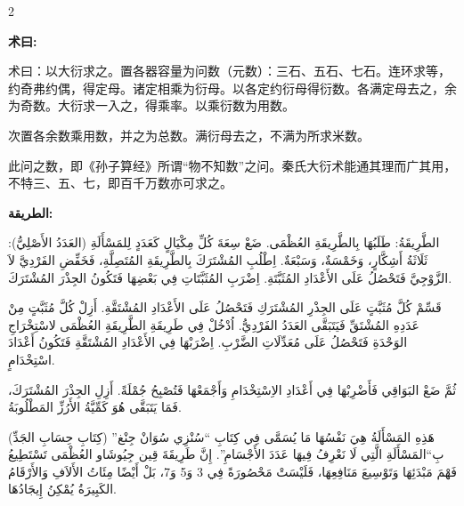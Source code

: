 \documentclass[11pt,a4paper]{article}
\newcommand{\ar}[1]{\arabicfont\beginR #1\endR}
\providecommand{\enquote}[1]{``#1''}
\newenvironment{bilingual}{%
  \begin{paracol}{2}
}{%
  \end{paracol}
}
\newcommand{\cnlabel}[1]{\textcolor{algocolor}{\textbf{#1}}}
\newcommand{\arlabel}[1]{\ar{\textcolor{algocolor}{\textbf{#1}}}}
\begin{document}
\vspace{1em}

\begin{bilingual}

\begin{leftcolumn*}
\cnlabel{术曰:}

术曰：以大衍求之。置各器容量为问数（元数）：三石、五石、七石。连环求等，约奇弗约偶，得定母。诸定相乘为衍母。以各定约衍母得衍数。各满定母去之，余为奇数。大衍求一入之，得乘率。以乘衍数为用数。

次置各余数乘用数，并之为总数。满衍母去之，不满为所求米数。

此问之数，即《孙子算经》所谓``物不知数''之问。秦氏大衍术能通其理而广其用，不特三、五、七，即百千万数亦可求之。
\end{leftcolumn*}

\begin{rightcolumn*}
\arlabel{الطريقة:}

\ar{الطَّرِيقَةُ: طَلَبُهَا بِالطَّرِيقَةِ العُظْمَى. ضَعْ سِعَةَ كُلِّ مِكْيَالٍ كَعَدَدٍ لِلمَسْأَلَةِ (العَدَدُ الأَصْلِيُّ): ثَلَاثَةُ أَشِكَّارٍ، وَخَمْسَةٌ، وَسَبْعَةٌ. اِطْلُبِ المُشْتَرَكَ بِالطَّرِيقَةِ المُتَصِلَّةِ، فَخَفِّضِ الفَرْدِيَّ لاَ الزَّوْجِيَّ فَتَحْصُلُ عَلَى الأَعْدَادِ المُثَبَّتَةِ. اِضْرَبِ المُثَبَّتَاتِ فِي بَعْضِهَا فَتَكُونُ الجِذْرَ المُشْتَرَكَ.}

\ar{قَسِّمْ كُلَّ مُثَبَّتٍ عَلَى الجِذْرِ المُشْتَرَكِ فَتَحْصُلُ عَلَى الأَعْدَادِ المُشْتَقَّةِ. أَزِلْ كُلَّ مُثَبَّتٍ مِنْ عَدَدِهِ المُشْتَقِّ فَيَتَبَقَّى العَدَدُ الفَرْدِيُّ. اُدْخُلْ فِي طَرِيقَةِ الطَّرِيقَةِ العُظْمَى لاسْتِخْرَاجِ الوَحْدَةِ فَتَحْصُلُ عَلَى مُعَدِّلَاتِ الضَّرْبِ. اِضْرَبْهَا فِي الأَعْدَادِ المُشْتَقَّةِ فَتَكُونُ أَعْدَادَ اسْتِخْدَامٍ.}

\ar{ثُمَّ ضَعْ البَوَاقِي فَأَضْرِبْهَا فِي أَعْدَادِ الاِسْتِخْدَامِ وَأَجْمَعْهَا فَتُصْبِحُ جُمْلَةً. أَزِلِ الجِذْرَ المُشْتَرَكَ، فَمَا يَتَبَقَّى هُوَ كَمِّيَّةُ الأَرُزِّ المَطْلُوبَةُ.}

\ar{هَذِهِ المَسْأَلَةُ هِيَ نَفْسُهَا مَا يُسَمَّى فِي كِتَابِ \enquote{سُنْزِي سُوَانْ جِنْغ} (كِتَابِ حِسَابِ الجَدِّ) بِ\enquote{المَسْأَلَةِ الَّتِي لَا نَعْرِفُ فِيهَا عَدَدَ الأَجْسَامِ}. إِنَّ طَرِيقَةَ قِين جِيُوشَاو العُظْمَى تَسْتَطِيعُ فَهْمَ مَبْدَئِهَا وَتَوْسِيعَ مَنَافِعِهَا، فَلَيْسَتْ مَحْصُورَةً فِي 3 وَ5 وَ7، بَلْ أَيْضًا مِئَاتُ الأَلاَفِ وَالأَرْقَامُ الكَبِيرَةُ يُمْكِنُ إِيجَادُهَا.}
\end{rightcolumn*}

\end{bilingual}
\end{document}
